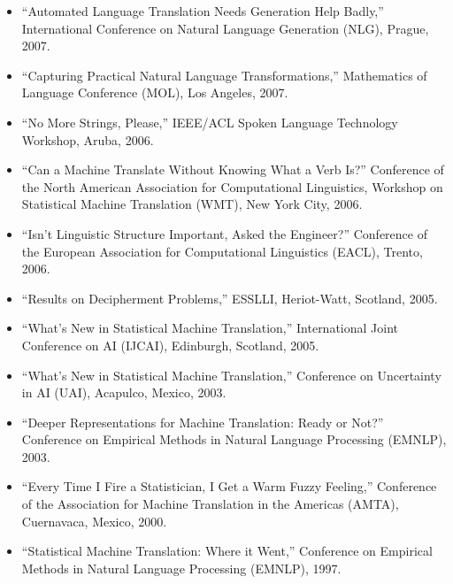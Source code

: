 \begin{itemize}
\item ``Automated Language Translation Needs Generation Help Badly,'' International Conference on Natural Language Generation (NLG), Prague, 2007.
\item ``Capturing Practical Natural Language Transformations,'' Mathematics of Language Conference (MOL), Los Angeles, 2007.
\item ``No More Strings, Please,'' IEEE/ACL Spoken Language Technology Workshop, Aruba, 2006.
\item ``Can a Machine Translate Without Knowing What a Verb Is?'' Conference of the North American Association for Computational Linguistics, Workshop on Statistical Machine Translation (WMT), New York City, 2006.
\item ``Isn't Linguistic Structure Important, Asked the Engineer?'' Conference of the European Association for Computational Linguistics (EACL), Trento, 2006.
\item ``Results on Decipherment Problems,'' ESSLLI, Heriot-Watt, Scotland, 2005.
\item ``What's New in Statistical Machine Translation,'' International Joint Conference on AI (IJCAI), Edinburgh, Scotland, 2005.
\item ``What's New in Statistical Machine Translation,'' Conference on Uncertainty in AI (UAI), Acapulco, Mexico, 2003.
\item ``Deeper Representations for Machine Translation: Ready or Not?'' Conference on Empirical Methods in Natural Language Processing (EMNLP), 2003.
\item ``Every Time I Fire a Statistician, I Get a Warm Fuzzy Feeling,'' Conference of the Association for Machine Translation in the Americas (AMTA), Cuernavaca, Mexico, 2000.
\item ``Statistical Machine Translation: Where it Went,'' Conference on Empirical Methods in Natural Language Processing (EMNLP), 1997.
\end{itemize}



